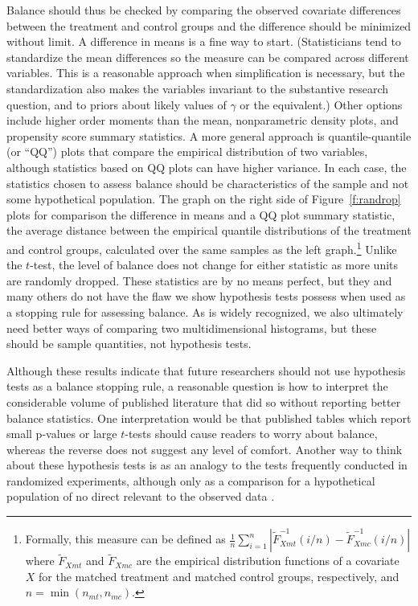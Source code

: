 \documentclass[11pt,titlepage]{article}
\begin{document}
Balance should thus be checked by comparing the observed covariate
differences between the treatment and control groups and the difference
should be minimized without limit.  A difference in means is a fine
way to start.  (Statisticians tend to standardize the mean differences
so the measure can be compared across different variables.  This is a
reasonable approach when simplification is necessary, but the
standardization also makes the variables invariant to the substantive
research question, and to priors about likely values of $\gamma$ or
the equivalent.) Other options include higher order moments than the
mean, nonparametric density plots, and propensity score summary
statistics. A more general approach is quantile-quantile (or ``QQ'')
plots that compare the empirical distribution of two variables,
although statistics based on QQ plots can have higher variance.  In each case, the statistics
chosen to assess balance should be characteristics of the sample and
not some hypothetical population.  The graph on the right side of
Figure~\ref{f:randrop} plots for comparison the difference in means
and a QQ plot summary statistic, the average distance between the
empirical quantile distributions of the treatment and control groups,
calculated over the same samples as the left graph.\footnote{Formally,
  this measure can be defined as $\frac{1}{n} \sum_{i=1}^n
  |\widetilde{F}_{Xmt}^{-1}(i/n) - \widetilde{F}^{-1}_{Xmc}(i/n)|$
  where $\widetilde{F}_{Xmt}$ and $\widetilde{F}_{Xmc}$ are the
  empirical distribution functions of a covariate $X$ for the matched
  treatment and matched control groups, respectively, and
  $n=\min(n_{mt},n_{mc})$.}  Unlike the $t$-test, the level of balance
does not change for either statistic as more units are randomly
dropped.  These statistics are by no means perfect, but they and many
others do not have the flaw we show hypothesis tests possess when used
as a stopping rule for assessing balance.  As is widely recognized, we
also ultimately need better ways of comparing two multidimensional
histograms, but these should be sample quantities, not hypothesis
tests.

Although these results indicate that future researchers should not use
hypothesis tests as a balance stopping rule, a reasonable question is
how to interpret the considerable volume of published literature that
did so without reporting better balance statistics.  One
interpretation would be that published tables which report small
p-values or large $t$-tests should cause readers to worry about
balance, whereas the reverse does not suggest any level of comfort.
Another way to think about these hypothesis tests is as an analogy to
the tests frequently conducted in randomized experiments, although
only as a comparison for a hypothetical population of no direct
relevant to the observed data \citep{Cochran65}.

\clearpage


\end{document}
